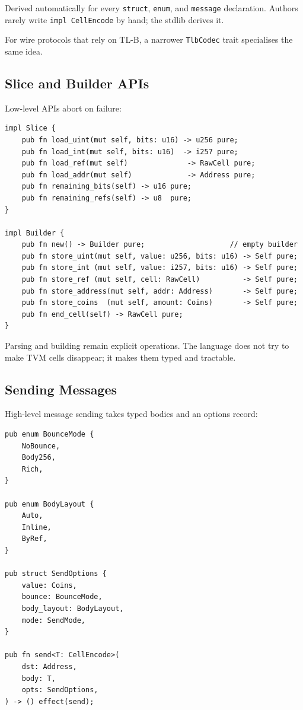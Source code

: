 \documentclass[12pt,oneside]{article}
\begin{document}
Derived automatically for every \verb|struct|, \verb|enum|, and
\verb|message| declaration. Authors rarely write
\verb|impl CellEncode| by hand; the stdlib derives it.

For wire protocols that rely on TL-B, a narrower \verb|TlbCodec| trait
specialises the same idea.

\subsection{Slice and Builder APIs}
Low-level APIs abort on failure:

\begin{verbatim}
impl Slice {
    pub fn load_uint(mut self, bits: u16) -> u256 pure;
    pub fn load_int(mut self, bits: u16)  -> i257 pure;
    pub fn load_ref(mut self)              -> RawCell pure;
    pub fn load_addr(mut self)             -> Address pure;
    pub fn remaining_bits(self) -> u16 pure;
    pub fn remaining_refs(self) -> u8  pure;
}

impl Builder {
    pub fn new() -> Builder pure;                    // empty builder
    pub fn store_uint(mut self, value: u256, bits: u16) -> Self pure;
    pub fn store_int (mut self, value: i257, bits: u16) -> Self pure;
    pub fn store_ref (mut self, cell: RawCell)          -> Self pure;
    pub fn store_address(mut self, addr: Address)       -> Self pure;
    pub fn store_coins  (mut self, amount: Coins)       -> Self pure;
    pub fn end_cell(self) -> RawCell pure;
}
\end{verbatim}

Parsing and building remain explicit operations. The language does
not try to make TVM cells disappear; it makes them typed and tractable.

\subsection{Sending Messages}
\label{sec:send-api}
High-level message sending takes typed bodies and an options record:

\begin{verbatim}
pub enum BounceMode {
    NoBounce,
    Body256,
    Rich,
}

pub enum BodyLayout {
    Auto,
    Inline,
    ByRef,
}

pub struct SendOptions {
    value: Coins,
    bounce: BounceMode,
    body_layout: BodyLayout,
    mode: SendMode,
}

pub fn send<T: CellEncode>(
    dst: Address,
    body: T,
    opts: SendOptions,
) -> () effect(send);
\end{verbatim}
\end{document}
